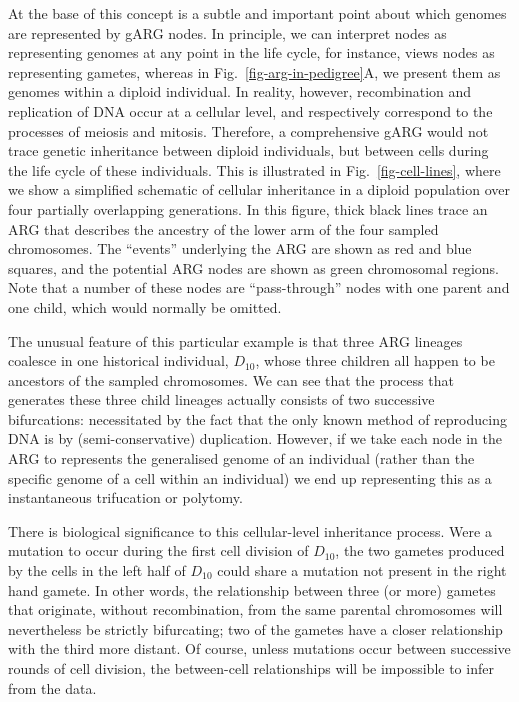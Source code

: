 \documentclass{article}
\begin{document}
At the base of this concept is a subtle and important point about which genomes are represented by gARG nodes.
In principle, we can interpret nodes as representing genomes
at any point in the life cycle, for instance, \citet{hudson1983properties} views nodes as representing gametes,
whereas in Fig.~\ref{fig-arg-in-pedigree}A, we present them as genomes within a diploid individual.
In reality, however, recombination and replication of DNA occur at a cellular level,
and respectively correspond to the processes of meiosis and mitosis. Therefore, a comprehensive gARG would not
trace genetic inheritance between diploid individuals, but between cells during the
life cycle of these individuals. This is illustrated in Fig.~\ref{fig-cell-lines}, where we show a simplified
schematic of cellular inheritance in a diploid population over four partially overlapping generations.
In this figure, thick black lines trace an ARG that describes the ancestry of the lower arm of the
four sampled chromosomes. The ``events'' underlying the ARG are shown as red and blue squares,
and the potential ARG nodes are shown as green chromosomal regions. Note that a number of these nodes are
``pass-through'' nodes with one parent and one child, which would normally be omitted.

The unusual feature of this particular example is that three ARG lineages coalesce in one historical individual,
$D_{10}$, whose three children all happen to be ancestors of the sampled chromosomes.
We can see that the process that generates these three child lineages actually consists of two successive bifurcations:
necessitated by the fact that the only known method of reproducing DNA is by (semi-conservative) duplication.
However, if we take each node in the ARG to represents the generalised genome of an individual (rather than the specific
genome of a cell within an individual) we end up representing this as a instantaneous trifucation or polytomy.

There is biological significance to this cellular-level inheritance process. Were a mutation to occur
during the first cell division of $D_{10}$, the two gametes produced by the cells
in the left half of $D_{10}$ could share a mutation not present in the right hand gamete. In other words,
the relationship between three (or more) gametes that originate, without recombination, from the same parental
chromosomes will nevertheless be strictly bifurcating; two of the gametes have a closer relationship with the
third more distant. Of course, unless mutations occur between successive rounds of cell division, the between-cell
relationships will be impossible to infer from the data.
\end{document}
